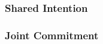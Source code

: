 \documentclass[a4paper,11pt,twoside]{StyleThese}
\begin{document}
\subsubsection{Shared Intention}

\subsubsection{Joint Commitment}

%
%
%
\end{document}
